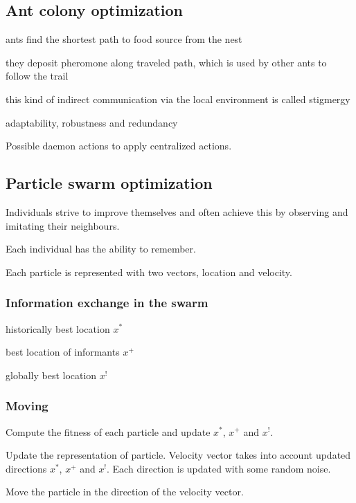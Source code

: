 \documentclass[a4paper]{article}
\begin{document}
\begin{multicols*}{2}
{	\subsection{Ant colony optimization}
	\begin{compactitem}
		\item ants find the shortest path to food source from the nest
		\item they deposit pheromone along traveled path, which is used by other ants to follow the trail
		\item this kind of indirect communication via the local environment is called stigmergy
		\item adaptability, robustness and redundancy
	\end{compactitem}
	Possible daemon actions to apply centralized actions.
	\subsection{Particle swarm optimization}
	\begin{compactitem}
		\item Individuals strive to improve themselves and often achieve this by observing and imitating their neighbours.
		\item Each individual has the ability to remember.
		\item Each particle is represented with two vectors, location and velocity.
	\end{compactitem}
	\subsubsection{Information exchange in the swarm}
	\begin{compactitem}
		\item historically best location $x^*$
		\item best location of informants $x^+$
		\item globally best location $x^!$
	\end{compactitem}
	\subsubsection{Moving}
	\begin{compactitem}
		\item Compute the fitness of each particle and update $x^*$, $x^+$ and $x^!$.
		\item Update the representation of particle.
		Velocity vector takes into account updated directions $x^*$, $x^+$ and $x^!$.
		Each direction is updated with some random noise.
		\item Move the particle in the direction of the velocity vector.
	\end{compactitem}

	}
\end{multicols*}
\end{document}
